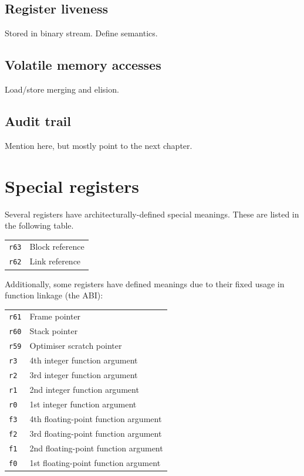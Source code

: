 \subsection{Register liveness}

Stored in binary stream. Define semantics.

\subsection{Volatile memory accesses}

Load/store merging and elision.

\subsection{Audit trail}

Mention here, but mostly point to the next chapter.

\section{Special registers}

Several registers have architecturally-defined special meanings. These are listed in the following table.

\begin{tabular}{ll}
\texttt{r63} & Block reference \\
\texttt{r62} & Link reference
\end{tabular}

Additionally, some registers have defined meanings due to their fixed usage in function linkage (the ABI):

\begin{tabular}{ll}
\texttt{r61} & Frame pointer \\
\texttt{r60} & Stack pointer \\
\texttt{r59} & Optimiser scratch pointer \\
\texttt{r3} & 4th integer function argument \\
\texttt{r2} & 3rd integer function argument \\
\texttt{r1} & 2nd integer function argument \\
\texttt{r0} & 1st integer function argument \\
\texttt{f3} & 4th floating-point function argument \\
\texttt{f2} & 3rd floating-point function argument \\
\texttt{f1} & 2nd floating-point function argument \\
\texttt{f0} & 1st floating-point function argument
\end{tabular}

